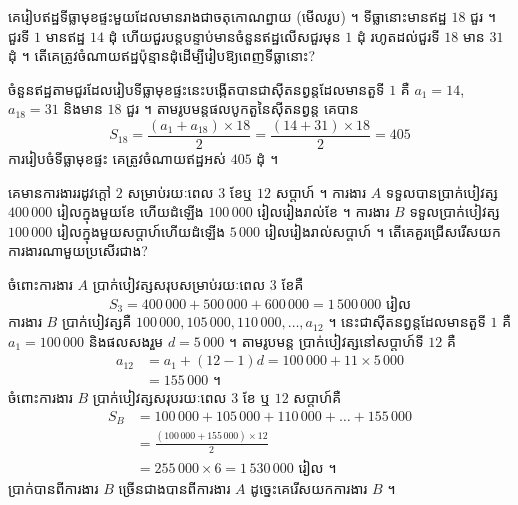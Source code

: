 \begin{example}[លំហាត់គំរូ ២]
គេរៀបឥដ្ឋទីធ្លាមុខផ្ទះមួយដែលមានរាងជាចតុកោណព្នាយ (មើលរូប) ។ ទីធ្លានោះមានឥដ្ឋ $18$ ជួរ ។ ជួរទី $1$ មានឥដ្ឋ $14$ ដុំ ហើយជួរបន្តបន្ទាប់មានចំនួនឥដ្ឋលើសជួរមុន $1$ ដុំ រហូតដល់ជួរទី $18$ មាន $31$ ដុំ ។ តើគេត្រូវចំណាយឥដ្ឋប៉ុន្មានដុំដើម្បីរៀបឱ្យពេញទីធ្លានោះ?

\begin{center}
\end{center}
\end{example}
\ans
ចំនួនឥដ្ឋតាមជួរដែលរៀបទីធ្លាមុខផ្ទះនេះបង្កើតបានជាស៊ីតនព្វន្តដែលមានតួទី $1$ គឺ $a_1 = 14$, $a_{18} = 31$ និងមាន $18$ ជួរ ។ តាមរូបមន្តផលបូកតួនៃស៊ីតនព្វន្ត គេបាន
\[ S_{18} = \frac{(a_1 + a_{18}) \times 18}{2} = \frac{(14 + 31) \times 18}{2} = 405 \]
ការរៀបចំទីធ្លាមុខផ្ទះ គេត្រូវចំណាយឥដ្ឋអស់ $405$ ដុំ ។

\begin{example}[លំហាត់គំរូ ៣]
គេមានការងាររដូវក្តៅ $2$ សម្រាប់រយៈពេល $3$ ខែឬ $12$ សប្តាហ៍ ។ ការងារ $A$ ទទួលបានប្រាក់បៀវត្ស $400\,000$ រៀលក្នុងមួយខែ ហើយដំឡើង $100\,000$ រៀលរៀងរាល់ខែ ។ ការងារ $B$ ទទួលប្រាក់បៀវត្ស $100\,000$ រៀលក្នុងមួយសប្តាហ៍ហើយដំឡើង $5\,000$ រៀលរៀងរាល់សប្តាហ៍ ។ តើគេគួរជ្រើសរើសយកការងារណាមួយប្រសើរជាង?
\end{example}
\ans
ចំពោះការងារ $A$ ប្រាក់បៀវត្សសរុបសម្រាប់រយៈពេល $3$ ខែគឺ
\[ S_3 = 400\,000 + 500\,000 + 600\,000 = 1\,500\,000 \text{ រៀល} \]
ការងារ $B$ ប្រាក់បៀវត្សគឺ $100\,000, 105\,000, 110\,000, \ldots, a_{12}$ ។ នេះជាស៊ីតនព្វន្តដែលមានតួទី $1$ គឺ $a_1 = 100\,000$ និងផលសងរួម $d = 5\,000$ ។ តាមរូបមន្ត ប្រាក់បៀវត្សនៅសប្តាហ៍ទី $12$ គឺ
\[
\begin{aligned}
a_{12} &= a_1 + (12 - 1)d = 100\,000 + 11 \times 5\,000\\
&= 155\,000 \text{ ។}
\end{aligned}
\]
ចំពោះការងារ $B$ ប្រាក់បៀវត្សសរុបរយៈពេល $3$ ខែ ឬ $12$ សប្តាហ៍គឺ
\[
\begin{aligned}
S_B &= 100\,000 + 105\,000 + 110\,000 + \ldots + 155\,000\\
&= \frac{(100\,000 + 155\,000) \times 12}{2}\\
&= 255\,000 \times 6 = 1\,530\,000 \text{ រៀល ។}
\end{aligned}
\]
ប្រាក់បានពីការងារ $B$ ច្រើនជាងបានពីការងារ $A$ ដូច្នេះគេរើសយកការងារ $B$ ។

